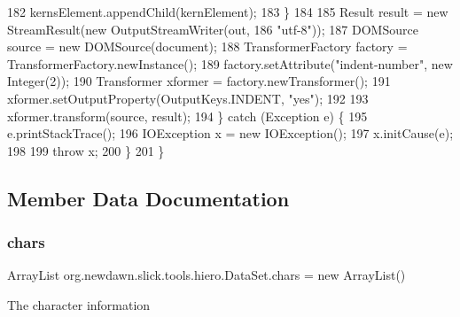 \begin{DoxyCode}
182                 kernsElement.appendChild(kernElement);
183             \}
184             
185             Result result = \textcolor{keyword}{new} StreamResult(\textcolor{keyword}{new} OutputStreamWriter(out,
186                     \textcolor{stringliteral}{"utf-8"}));
187             DOMSource source = \textcolor{keyword}{new} DOMSource(document);
188             TransformerFactory factory = TransformerFactory.newInstance();
189             factory.setAttribute(\textcolor{stringliteral}{"indent-number"}, \textcolor{keyword}{new} Integer(2));
190             Transformer xformer = factory.newTransformer();
191             xformer.setOutputProperty(OutputKeys.INDENT, \textcolor{stringliteral}{"yes"});
192             
193             xformer.transform(source, result);
194         \} \textcolor{keywordflow}{catch} (Exception e) \{
195             e.printStackTrace();
196             IOException x = \textcolor{keyword}{new} IOException();
197             x.initCause(e);
198             
199             \textcolor{keywordflow}{throw} x;
200         \}
201     \}
\end{DoxyCode}


\subsection{Member Data Documentation}
\mbox{\label{classorg_1_1newdawn_1_1slick_1_1tools_1_1hiero_1_1_data_set_a6623d34b60d062494838b664632c15a6}} 
\subsubsection{\texorpdfstring{chars}{chars}}
{\footnotesize\ttfamily Array\+List org.\+newdawn.\+slick.\+tools.\+hiero.\+Data\+Set.\+chars = new Array\+List()\hspace{0.3cm}{\ttfamily [private]}}

The character information \mbox{\label{classorg_1_1newdawn_1_1slick_1_1tools_1_1hiero_1_1_data_set_ab0f4c67d67a65d79f10572e7ce459769}} 
